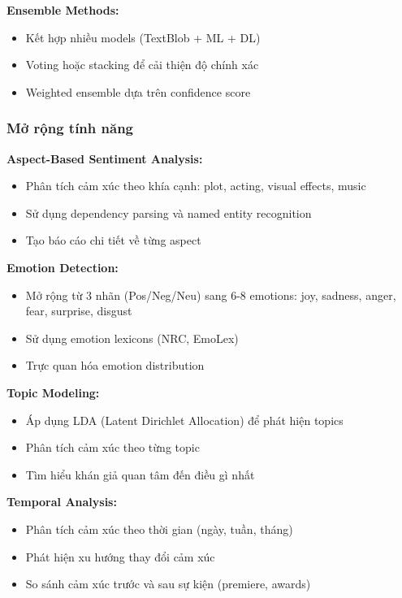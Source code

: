 \textbf{Ensemble Methods:}
\begin{itemize}
    \item Kết hợp nhiều models (TextBlob + ML + DL)
    \item Voting hoặc stacking để cải thiện độ chính xác
    \item Weighted ensemble dựa trên confidence score
\end{itemize}

\subsubsection{Mở rộng tính năng}

\textbf{Aspect-Based Sentiment Analysis:}
\begin{itemize}
    \item Phân tích cảm xúc theo khía cạnh: plot, acting, visual effects, music
    \item Sử dụng dependency parsing và named entity recognition
    \item Tạo báo cáo chi tiết về từng aspect
\end{itemize}

\textbf{Emotion Detection:}
\begin{itemize}
    \item Mở rộng từ 3 nhãn (Pos/Neg/Neu) sang 6-8 emotions: joy, sadness, anger, fear, surprise, disgust
    \item Sử dụng emotion lexicons (NRC, EmoLex)
    \item Trực quan hóa emotion distribution
\end{itemize}

\textbf{Topic Modeling:}
\begin{itemize}
    \item Áp dụng LDA (Latent Dirichlet Allocation) để phát hiện topics
    \item Phân tích cảm xúc theo từng topic
    \item Tìm hiểu khán giả quan tâm đến điều gì nhất
\end{itemize}

\textbf{Temporal Analysis:}
\begin{itemize}
    \item Phân tích cảm xúc theo thời gian (ngày, tuần, tháng)
    \item Phát hiện xu hướng thay đổi cảm xúc
    \item So sánh cảm xúc trước và sau sự kiện (premiere, awards)
\end{itemize}

